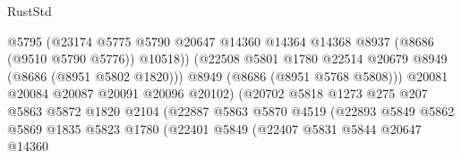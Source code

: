 \begin{lexlean}{RustStd}
\begin{coremodule}
                                          @5795
                                          (@23174
                                            @5775
                                            @5790
                                            @20647
                                            @14360
                                            @14364
                                            @14368
                                            @8937
                                            (@8686 (@9510 @5790 @5776))
                                            @10518))
                                        (@22508
                                          @5801
                                          @1780
                                          @22514
                                          @20679
                                          @8949
                                          (@8686 (@8951 @5802 @1820)))
                                        @8949
                                        (@8686 (@8951 @5768 @5808)))
                                      @20081
                                      @20084
                                      @20087
                                      @20091
                                      @20096
                                      @20102)
                                    (@20702
                                      @5818
                                      @1273
                                      @275
                                      @207
                                      @5863
                                      @5872
                                      @1820
                                      @2104
                                      (@22887
                                        @5863
                                        @5870
                                        @4519
                                        (@22893
                                          @5849
                                          @5862
                                          @5869
                                          @1835
                                          @5823
                                          @1780
                                          (@22401
                                            @5849
                                            (@22407
                                              @5831
                                              @5844
                                              @20647
                                              @14360

\end{coremodule}
\end{lexlean}
